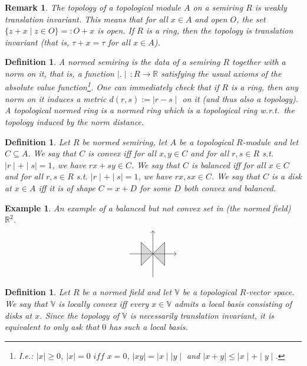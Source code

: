 \documentclass[submission,copyright,creativecommons]{eptcs}
\newtheorem{Definition}[theorem]{Definition}
\newtheorem{Example}[theorem]{Example}
\newtheorem{Remark}[theorem]{Remark}
\newcommand{\R}{\mathbb{R}}
\newcommand{\set}[1]{\{#1\}}
\newcommand{\absv}[1]{\mid #1\mid}
\begin{document}
\begin{Remark}
 The topology of a topological module $A$ on a semiring $R$ is weakly translation invariant.
 This means that for all $x\in A$ and open $O$, the set $\set{z+x\mid z\in O}=:O+x$ is open.
 If $R$ is a ring, then the topology is translation invariant (that is, $\tau+x= \tau$ for all $x\in A$).
\end{Remark}

\begin{Definition}
 A \emph{normed semiring} is the data of a semiring $R$ together with a \emph{norm} on it, that is, a function $\absv{.}\,:R\to\R$ satisfying the usual axioms of the absolute value function\footnote{I.e.: $\absv{x}\geq 0$, $\absv x =0 \textit{ iff } x=0$, $\absv{xy}=\absv x\absv y$ and $\absv{x+y}\leq \absv x+\absv y$.}.
 One can immediately check that if $R$ is a ring, then any norm on it induces a metric $d(r,s):=\mid r-s\mid$ on it (and thus also a topology).
 A \emph{topological normed ring} is a normed ring which is a topological ring w.r.t.\ the topology induced by the norm distance.
\end{Definition}

\begin{Definition}
 Let $R$ be normed semiring, let $A$ be a topological $R$-module and let $C\subseteq A$.
 We say that $C$ is \emph{convex} iff for all $x,y\in C$ and for all $r,s\in R$ s.t. $\mid r\mid +\mid s\mid =1$, we have $rx+sy\in C$.
 We say that $C$ is \emph{balanced} iff for all $x\in C$ and for all $r,s\in R$ s.t. $\mid r\mid +\mid s\mid =1$, we have $rx,sx\in C$.
 We say that $C$ is a \emph{disk at $x\in A$} iff it is of shape $C=x+D$ for some $D$ both convex and balanced.
\end{Definition}

\begin{Example}
 An example of a balanced but not convex set in (the normed field) $\R^2$.
 \[\begin{tikzpicture}
 \draw[->] (0,-1) -- (0,1);
 \draw[->] (-1,0) -- (1,0);
 \draw[fill=gray, fill opacity=0.3] (0,0) -- (0.5,-0.5) -- (0.5,0.5) -- (0,0) -- (-0.5,0.5) -- (-0.5,-0.5) -- cycle;
\end{tikzpicture}\]
\end{Example}

\begin{Definition}
 Let $R$ be a normed field and let $\mathbb{V}$ be a topological $R$-vector space. We say that $\mathbb{V}$ is \emph{locally convex} iff every $x\in \mathbb{V}$ admits a local basis consisting of disks at $x$.
 Since the topology of $\mathbb{V}$ is necessarily translation invariant,
 it is equivalent to only ask that $0$ has such a local basis.
\end{Definition}
\end{document}
